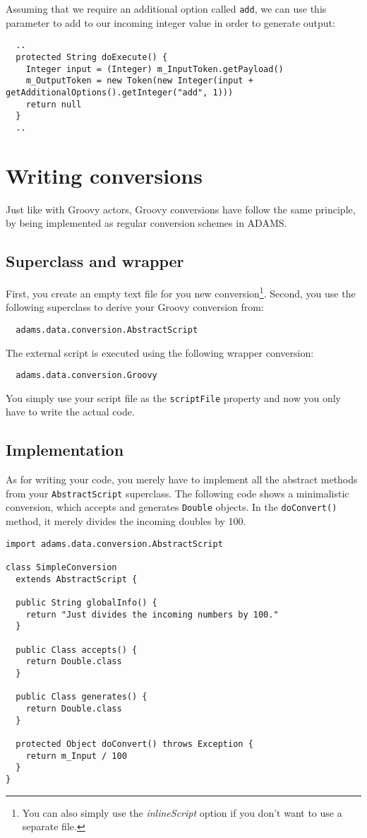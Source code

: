 \documentclass[a4paper]{book}
\begin{document}
Assuming that we require an additional option called \texttt{add}, we can use
this parameter to add to our incoming integer value in order to generate output:
{\small
\begin{verbatim}
  ..
  protected String doExecute() {
    Integer input = (Integer) m_InputToken.getPayload()
    m_OutputToken = new Token(new Integer(input + getAdditionalOptions().getInteger("add", 1)))
    return null
  }
  ..
\end{verbatim}
}

\chapter{Writing conversions}
Just like with Groovy actors, Groovy conversions have follow the same principle,
by being implemented as regular conversion schemes in ADAMS.

\section{Superclass and wrapper}
First, you create an empty text file for you new 
conversion\footnote{You can also simply use the \textit{inlineScript} option if you don't 
want to use a separate file.}. Second, you use the following superclass to derive your
Groovy conversion from:
\begin{verbatim}
  adams.data.conversion.AbstractScript
\end{verbatim}
The external script is executed using the following wrapper conversion:
\begin{verbatim}
  adams.data.conversion.Groovy
\end{verbatim}
You simply use your script file as the \texttt{scriptFile} property and now you
only have to write the actual code.

\newpage
\section{Implementation}
As for writing your code, you merely have to implement all the abstract methods
from your \texttt{AbstractScript} superclass. The following code shows a
minimalistic conversion, which accepts and generates \texttt{Double}
objects. In the \texttt{doConvert()} method, it merely divides the incoming
doubles by 100.
\begin{verbatim}
import adams.data.conversion.AbstractScript

class SimpleConversion
  extends AbstractScript {

  public String globalInfo() {
    return "Just divides the incoming numbers by 100."
  }

  public Class accepts() {
    return Double.class
  }

  public Class generates() {
    return Double.class
  }

  protected Object doConvert() throws Exception {
    return m_Input / 100
  }
}
\end{verbatim}
\end{document}
